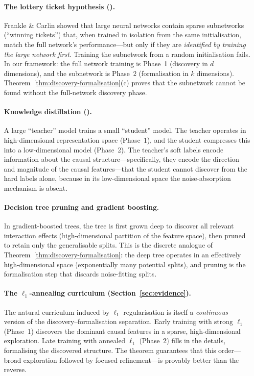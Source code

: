 \documentclass[11pt,a4paper]{article}
\theoremstyle{plain}
\theoremstyle{definition}
\theoremstyle{remark}
\begin{document}
\paragraph{The lottery ticket hypothesis
\textnormal{(\citealt{frankle2019lottery})}.}
Frankle \& Carlin showed that large neural networks contain sparse subnetworks
(``winning tickets'') that, when trained in isolation from the same
initialisation, match the full network's performance---but only if they are
\emph{identified by training the large network first}.  Training the
subnetwork from a random initialisation fails.  In our framework: the full
network training is Phase~1 (discovery in $d$ dimensions), and the subnetwork
is Phase~2 (formalisation in $k$ dimensions).
Theorem~\ref{thm:discovery-formalisation}(c) proves that the subnetwork cannot
be found without the full-network discovery phase.

\paragraph{Knowledge distillation
\textnormal{(\citealt{hinton2015distilling})}.}
A large ``teacher'' model trains a small ``student'' model.  The teacher
operates in high-dimensional representation space (Phase~1), and the student
compresses this into a low-dimensional model (Phase~2).  The teacher's soft
labels encode information about the causal structure---specifically, they encode
the direction and magnitude of the causal features---that the student cannot
discover from the hard labels alone, because in its low-dimensional space the
noise-absorption mechanism is absent.

\paragraph{Decision tree pruning and gradient boosting.}
In gradient-boosted trees, the tree is first grown deep to discover all relevant
interaction effects (high-dimensional partition of the feature space), then
pruned to retain only the generalisable splits.  This is the discrete analogue of
Theorem~\ref{thm:discovery-formalisation}: the deep tree operates in an
effectively high-dimensional space (exponentially many potential splits), and
pruning is the formalisation step that discards noise-fitting splits.

\paragraph{The $\ell_1$-annealing curriculum (Section~\ref{sec:evidence}).}
The natural curriculum induced by $\ell_1$-regularisation is itself a
\emph{continuous} version of the discovery--formalisation separation.  Early
training with strong $\ell_1$ (Phase~1) discovers the dominant causal features
in a sparse, high-dimensional exploration.  Late training with annealed $\ell_1$
(Phase~2) fills in the details, formalising the discovered structure.  The
theorem guarantees that this order---broad exploration followed by focused
refinement---is provably better than the reverse.
\end{document}
